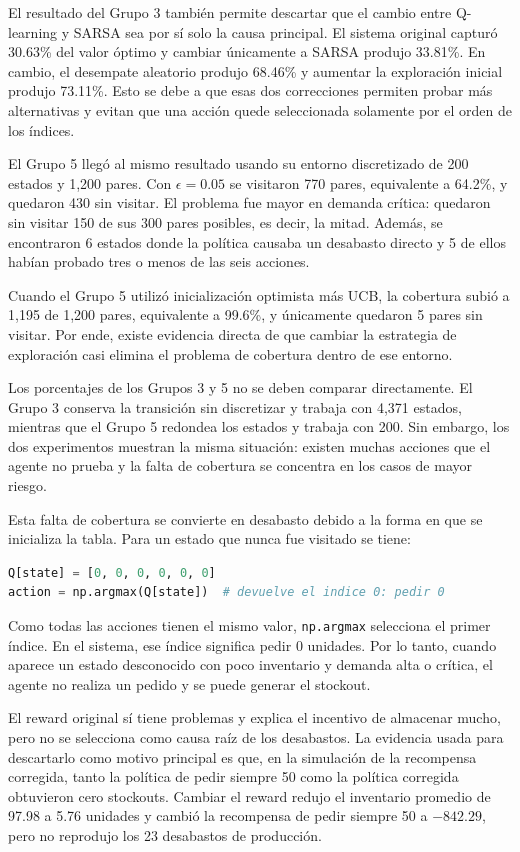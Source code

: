 \documentclass[11pt,letterpaper]{article}
\begin{document}
El resultado del Grupo 3 también permite descartar que el cambio entre
Q-learning y SARSA sea por sí solo la causa principal. El sistema original
capturó 30.63\% del valor óptimo y cambiar únicamente a SARSA produjo 33.81\%.
En cambio, el desempate aleatorio produjo 68.46\% y aumentar la exploración
inicial produjo 73.11\%. Esto se debe a que esas dos correcciones permiten probar
más alternativas y evitan que una acción quede seleccionada solamente por el
orden de los índices.

El Grupo 5 llegó al mismo resultado usando su entorno discretizado de 200
estados y 1,200 pares. Con $\epsilon=0.05$ se visitaron 770 pares, equivalente a
64.2\%, y quedaron 430 sin visitar. El problema fue mayor en demanda crítica:
quedaron sin visitar 150 de sus 300 pares posibles, es decir, la mitad. Además,
se encontraron 6 estados donde la política causaba un desabasto directo y 5 de
ellos habían probado tres o menos de las seis acciones.

Cuando el Grupo 5 utilizó inicialización optimista más UCB, la cobertura subió a
1,195 de 1,200 pares, equivalente a 99.6\%, y únicamente quedaron 5 pares sin
visitar. Por ende, existe evidencia directa de que cambiar la estrategia de
exploración casi elimina el problema de cobertura dentro de ese entorno.

Los porcentajes de los Grupos 3 y 5 no se deben comparar directamente. El Grupo
3 conserva la transición sin discretizar y trabaja con 4,371 estados, mientras
que el Grupo 5 redondea los estados y trabaja con 200. Sin embargo, los dos
experimentos muestran la misma situación: existen muchas acciones que el agente
no prueba y la falta de cobertura se concentra en los casos de mayor riesgo.

Esta falta de cobertura se convierte en desabasto debido a la forma en que se
inicializa la tabla. Para un estado que nunca fue visitado se tiene:

\begin{lstlisting}[language=Python]
Q[state] = [0, 0, 0, 0, 0, 0]
action = np.argmax(Q[state])  # devuelve el indice 0: pedir 0
\end{lstlisting}

Como todas las acciones tienen el mismo valor, \texttt{np.argmax} selecciona el
primer índice. En el sistema, ese índice significa pedir 0 unidades. Por lo
tanto, cuando aparece un estado desconocido con poco inventario y demanda alta o
crítica, el agente no realiza un pedido y se puede generar el stockout.

El reward original sí tiene problemas y explica el incentivo de almacenar mucho,
pero no se selecciona como causa raíz de los desabastos. La evidencia usada para
descartarlo como motivo principal es que, en la simulación de la recompensa
corregida, tanto la política de pedir siempre 50 como la política corregida
obtuvieron cero stockouts. Cambiar el reward redujo el inventario promedio de
97.98 a 5.76 unidades y cambió la recompensa de pedir siempre 50 a $-842.29$,
pero no reprodujo los 23 desabastos de producción.
\end{document}
